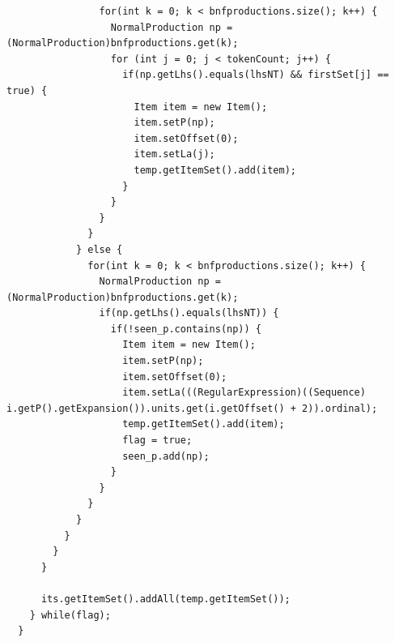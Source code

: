 \documentclass[oneside]{book}
\begin{document}
\begin{lstlisting}
                for(int k = 0; k < bnfproductions.size(); k++) {
                  NormalProduction np = (NormalProduction)bnfproductions.get(k);
                  for (int j = 0; j < tokenCount; j++) {
                    if(np.getLhs().equals(lhsNT) && firstSet[j] == true) {
                      Item item = new Item();
                      item.setP(np);
                      item.setOffset(0);
                      item.setLa(j);
                      temp.getItemSet().add(item);
                    }
                  }
                }
              }
            } else {
              for(int k = 0; k < bnfproductions.size(); k++) {
                NormalProduction np = (NormalProduction)bnfproductions.get(k);
                if(np.getLhs().equals(lhsNT)) {
                  if(!seen_p.contains(np)) {                
                    Item item = new Item();
                    item.setP(np);
                    item.setOffset(0);
                    item.setLa(((RegularExpression)((Sequence) i.getP().getExpansion()).units.get(i.getOffset() + 2)).ordinal);
                    temp.getItemSet().add(item);
                    flag = true;
                    seen_p.add(np);
                  }
                }
              }
            }
          }
        }
      }
      
      its.getItemSet().addAll(temp.getItemSet());
    } while(flag);  
  }
\end{lstlisting}
\end{document}
